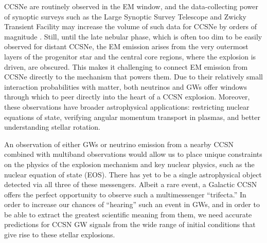 \documentclass[twocolumn,times]{aastex62}  %
\begin{document}
CCSNe are routinely observed in the EM window, and the data-collecting power of synoptic surveys such as the Large Synoptic Survey Telescope and Zwicky Transient Facility may increase the volume of such data for CCSNe by orders of magnitude \citep{ivezic:2008,bellm:2019}.
Still, until the late nebular phase, which is often too dim to be easily observed for distant CCSNe, the EM emission arises from the very outermost layers of the progenitor star and the central core regions, where the explosion is driven, are obscured. 
This makes it challenging to connect EM emission from CCSNe directly to the mechanism that powers them.
Due to their relatively small interaction probabilities with matter, both neutrinos and GWs offer windows through which to peer directly into the heart of a CCSN explosion.  
Moreover, these observations have broader astrophysical applications: restricting nuclear equations of state, verifying angular momentum transport in plasmas, and better understanding stellar rotation.

An observation of either GWs or neutrino emission from a nearby CCSN combined with multiband observations would allow us to place unique constraints on the physics of the explosion mechanism and key nuclear physics, such as the nuclear equation of state (EOS).  
There has yet to be a single astrophysical object detected via all three of these messengers.  
Albeit a rare event, a Galactic CCSN offers the perfect opportunity to observe such a multimessenger ``trifecta.''  
In order to increase our chances of ``hearing'' such an event in GWs, and in order to be able to extract the greatest scientific meaning from them, we need accurate predictions for CCSN GW signals from the wide range of initial conditions that give rise to these stellar explosions.
\end{document}

